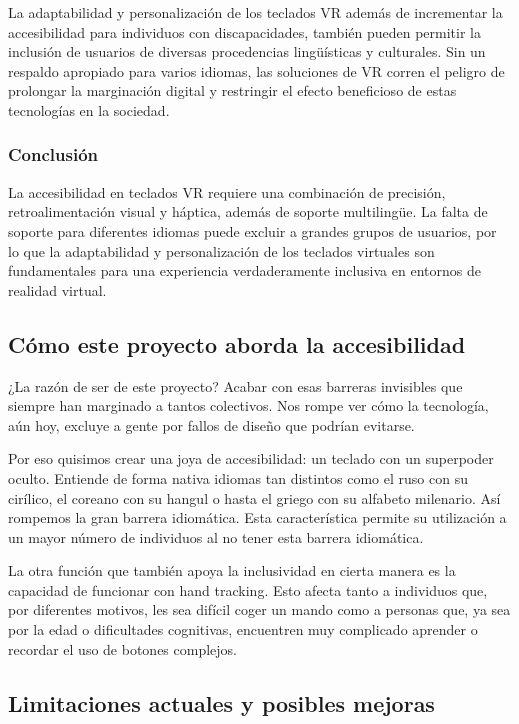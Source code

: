 La adaptabilidad y personalización de los teclados VR además de incrementar la accesibilidad para individuos con discapacidades, también pueden permitir la inclusión de usuarios de diversas procedencias lingüísticas y culturales. Sin un respaldo apropiado para varios idiomas, las soluciones de VR corren el peligro de prolongar la marginación digital y restringir el efecto beneficioso de estas tecnologías en la sociedad. \cite{Banerjee2024Machine-Learning-Based}\cite{reconviguration}

\subsubsection{Conclusión}

La accesibilidad en teclados VR requiere una combinación de precisión, retroalimentación visual y háptica, además de soporte multilingüe. La falta de soporte para diferentes idiomas puede excluir a grandes grupos de usuarios, por lo que la adaptabilidad y personalización de los teclados virtuales son fundamentales para una experiencia verdaderamente inclusiva en entornos de realidad virtual.

\subsection{Cómo este proyecto aborda la accesibilidad}

¿La razón de ser de este proyecto? Acabar con esas barreras invisibles que siempre han marginado a tantos colectivos. Nos rompe ver cómo la tecnología, aún hoy, excluye a gente por fallos de diseño que podrían evitarse. 

Por eso quisimos crear una joya de accesibilidad: un teclado con un superpoder oculto. Entiende de forma nativa idiomas tan distintos como el ruso con su cirílico, el coreano con su hangul o hasta el griego con su alfabeto milenario. Así rompemos la gran barrera idiomática. Esta característica permite su utilización a un mayor número de individuos al no tener esta barrera idiomática.

La otra función que también apoya la inclusividad en cierta manera es la capacidad de funcionar con hand tracking. Esto afecta tanto a individuos que, por diferentes motivos, les sea difícil coger un mando como a personas que, ya sea por la edad o dificultades cognitivas, encuentren muy complicado aprender o recordar el uso de botones complejos.

\subsection{Limitaciones actuales y posibles mejoras}

